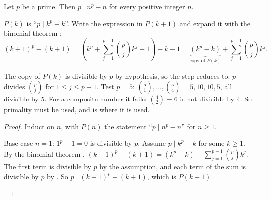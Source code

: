 \documentclass[10pt]{scrartcl}
\begin{document}
\begin{theorem*}
  Let $p$ be a prime. Then $p \mid n^p - n$ for every positive integer $n$.
\end{theorem*}

$P(k)$ is ``$p \mid k^p - k$''. Write the expression in $P(k+1)$ and expand it with the binomial theorem :
\[
  (k+1)^p - (k+1) = \left( k^p + \sum_{j=1}^{p-1} \binom pj k^j + 1 \right) - k - 1
  = \underbrace{(k^p - k)}_{\text{copy of } P(k)} + \sum_{j=1}^{p-1} \binom pj k^j.
\]
\begin{ideabox}
  The copy of $P(k)$ is divisible by $p$ by hypothesis, so the step reduces to: $p$ divides $\binom pj$ for $1 \le j \le p-1$. Test $p = 5$: $\binom51, \dots, \binom54 = 5, 10, 10, 5$, all divisible by $5$. For a composite number it fails: $\binom 42 = 6$ is not divisible by $4$. So primality must be used, and  is where it is used.
\end{ideabox}
\begin{proof}
  Induct on $n$, with $P(n)$ the statement ``$p \mid n^p - n$'' for $n \geq 1$.
  \begin{steps}
    \ii Base case $n = 1$: $1^p - 1 = 0$ is divisible by $p$.
    \ii Assume $p \mid k^p - k$ for some $k \geq 1$. By the binomial theorem , $(k+1)^p - (k+1) = (k^p - k) + \sum_{j=1}^{p-1} \binom pj k^j$.
    \ii The first term is divisible by $p$ by the assumption, and each term of the sum is divisible by $p$ by . So $p \mid (k+1)^p - (k+1)$, which is $P(k+1)$.
  \end{steps}
\end{proof}

\begin{fig}
\end{fig}
\end{document}
